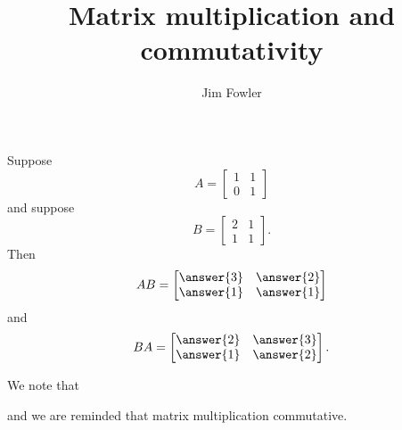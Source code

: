 \documentclass{ximera}
\title{Matrix multiplication and commutativity}
\author{Jim Fowler}
\begin{document}
\begin{problem}
Suppose
\[
  A = \begin{bmatrix}
    1 & 1 \\
    0 & 1
  \end{bmatrix}
\]
and suppose
\[
  B = \begin{bmatrix}
    2 & 1 \\
    1 & 1
  \end{bmatrix}.
\]
Then
\[
  AB =
  \begin{bmatrix}
    \answer{3} & \answer{2} \\
    \answer{1} & \answer{1}
  \end{bmatrix}
\]
and
\[
  BA = \begin{bmatrix}
    \answer{2} & \answer{3} \\
    \answer{1} & \answer{2}
  \end{bmatrix}.
\]

\begin{problem}
  We note that
  \begin{multipleChoice}
  \end{multipleChoice}
  and we are reminded that matrix multiplication
   commutative.
\end{problem}
\end{problem}
\end{document}
